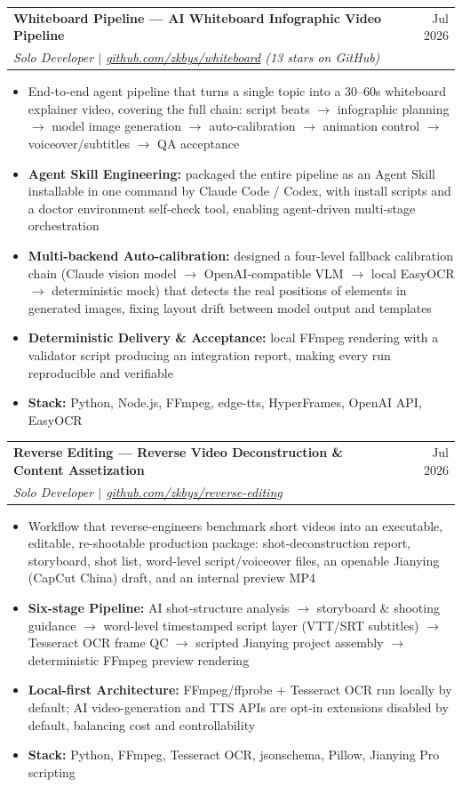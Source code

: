 \documentclass[letterpaper,11pt]{article}
\makeatletter
\newcommand{\resumeItem}[1]{
  \item\small{{#1 \vspace{-2pt}}}
}
\newcommand{\resumeProjectHeading}[4]{
    \vspace{-1pt}\item
    \begin{tabular*}{0.97\textwidth}[t]{l@{\extracolsep{\fill}}r}
      \textbf{\small #1} & \small #2 \\
      \textit{\small #3} & \\
    \end{tabular*}\vspace{-6pt}
}
\newcommand{\resumeItemListStart}{\begin{itemize}}
\newcommand{\resumeItemListEnd}{\end{itemize}\vspace{-5pt}}
\makeatother
\begin{document}
    \resumeProjectHeading
      {Whiteboard Pipeline --- AI Whiteboard Infographic Video Pipeline}{Jul 2026}
      {Solo Developer $|$ \href{https://github.com/zkbys/whiteboard}{\underline{github.com/zkbys/whiteboard}} (13 stars on GitHub)}{}
      \resumeItemListStart
        \resumeItem{End-to-end agent pipeline that turns a single topic into a 30--60s whiteboard explainer video, covering the full chain: script beats $\rightarrow$ infographic planning $\rightarrow$ model image generation $\rightarrow$ auto-calibration $\rightarrow$ animation control $\rightarrow$ voiceover/subtitles $\rightarrow$ QA acceptance}
        \resumeItem{\textbf{Agent Skill Engineering:} packaged the entire pipeline as an Agent Skill installable in one command by Claude Code / Codex, with install scripts and a doctor environment self-check tool, enabling agent-driven multi-stage orchestration}
        \resumeItem{\textbf{Multi-backend Auto-calibration:} designed a four-level fallback calibration chain (Claude vision model $\rightarrow$ OpenAI-compatible VLM $\rightarrow$ local EasyOCR $\rightarrow$ deterministic mock) that detects the real positions of elements in generated images, fixing layout drift between model output and templates}
        \resumeItem{\textbf{Deterministic Delivery \& Acceptance:} local FFmpeg rendering with a validator script producing an integration report, making every run reproducible and verifiable}
        \resumeItem{\textbf{Stack:} Python, Node.js, FFmpeg, edge-tts, HyperFrames, OpenAI API, EasyOCR}
      \resumeItemListEnd

    \resumeProjectHeading
      {Reverse Editing --- Reverse Video Deconstruction \& Content Assetization}{Jul 2026}
      {Solo Developer $|$ \href{https://github.com/zkbys/reverse-editing}{\underline{github.com/zkbys/reverse-editing}}}{}
      \resumeItemListStart
        \resumeItem{Workflow that reverse-engineers benchmark short videos into an executable, editable, re-shootable production package: shot-deconstruction report, storyboard, shot list, word-level script/voiceover files, an openable Jianying (CapCut China) draft, and an internal preview MP4}
        \resumeItem{\textbf{Six-stage Pipeline:} AI shot-structure analysis $\rightarrow$ storyboard \& shooting guidance $\rightarrow$ word-level timestamped script layer (VTT/SRT subtitles) $\rightarrow$ Tesseract OCR frame QC $\rightarrow$ scripted Jianying project assembly $\rightarrow$ deterministic FFmpeg preview rendering}
        \resumeItem{\textbf{Local-first Architecture:} FFmpeg/ffprobe + Tesseract OCR run locally by default; AI video-generation and TTS APIs are opt-in extensions disabled by default, balancing cost and controllability}
        \resumeItem{\textbf{Stack:} Python, FFmpeg, Tesseract OCR, jsonschema, Pillow, Jianying Pro scripting}
      \resumeItemListEnd
\end{document}
